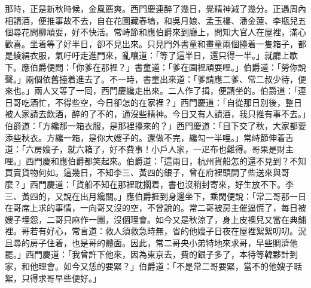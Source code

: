 那時，正是新秋時候，金風薦爽。西門慶連醉了幾日，覺精神減了幾分。正遇周內相請酒，便推事故不去，自在花園藏春塢，和吳月娘、孟玉樓、潘金蓮、李瓶兒五個尋花問柳頑耍，好不快活。{}常峙節和應伯爵來到廳上，問知大官人在屋裡，滿心歡喜。坐着等了好半日，卻不見出來。只見門外書童和畫童兩個擡着一隻箱子，都是綾絹衣服，氣吁吁走進門來，亂嚷道：「等了這半日，還只得一半。」就廳上歇下。應伯爵便問：「你爹在那裡？」書童道：「爹在園裡頑耍哩。」伯爵道：「勞你說聲。」兩個依舊擡着進去了。不一時，書童出來道：「爹請應二爹、常二叔少待，便來也。」兩人又等了一囘，西門慶纔走出來。二人作了揖，便請坐的。伯爵道：「連日哥吃酒忙，不得些空，今日卻怎的在家裡？」西門慶道：「自從那日別後，整日被人家請去飲酒，醉的了不的，通沒些精神。今日又有人請酒，我只推有事不去。」伯爵道：「方纔那一箱衣服，是那裡擡來的？」西門慶道：「目下交了秋，大家都要添些秋衣。方纔一箱，是你大嫂子的。還做不完，纔勾一半哩。」常峙節伸着舌道：「六房嫂子，就六箱了，好不費事！小戶人家，一疋布也難得。哥果是財主哩。」{}西門慶和應伯爵都笑起來。伯爵道：「這兩日，杭州貨船怎的還不見到？不知買賣貨物何如。這幾日，不知李三、黃四的銀子，曾在府裡頭開了些送來與哥麼？」西門慶道：「貨船不知在那裡耽擱着，書也沒稍封寄來，好生放不下。李三、黃四的，又說在出月纔關。」應伯爵捱到身邊坐下，乘閑便說：{}「常二哥那一日在哥席上求的事情，一向哥又沒的空，不曾說的。常二哥被房主催逼慌了，每日被嫂子埋怨，二哥只麻作一團，沒個理會。如今又是秋涼了，身上皮襖兒又當在典鋪裡。哥若有好心，常言道：救人須救急時無，省的他嫂子日夜在屋裡絮絮叨叨。況且尋的房子住着，也是哥的體面。因此，常二哥央小弟特地來求哥，早些賙濟他罷。」西門慶道：「我曾許下他來，因為東京去，費的銀子多了，本待等韓夥計到家，和他理會。如今又恁的要緊？」伯爵道：「不是常二哥要緊，當不的他嫂子聒絮，只得求哥早些便好。」

